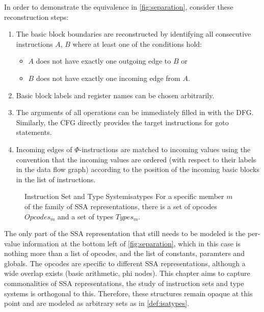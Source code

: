     In order to demonstrate the equivalence in \autoref{fig:separation},
    consider these reconstruction steps:
\begin{enumerate}
    \item The basic block boundaries are reconstructed by identifying all
          consecutive instructions $A$, $B$ where at least one of the
    conditions hold:
    \begin{itemize}
        \item $A$ does not have exactly one outgoing edge to $B$ or
        \item $B$ does not have exactly one incoming edge from $A$.
    \end{itemize}
    \item Basic block labels and register names can be chosen arbitrarily.
    \item The arguments of all operations can be immediately filled in with the 
          DFG. Similarly, the CFG directly provides the target instructions
          for goto statements.
    \item Incoming edges of $\Phi$-instructions are matched to incoming values
          using the convention that the incoming values are ordered
          (with respect to their labels in the data flow graph) according to the
          position of the incoming basic blocks in the list of instructions.
\end{enumerate}

\begin{figure}[b]
\begin{definition}{Instruction Set and Type System}{isatypes}
    For a specific member $m$ of the family of SSA representations, there is
    a set of opcodes $Opcodes_m$ and a set of types $Types_m$.
\end{definition}
\end{figure}

    The only part of the SSA representation that still needs to be modeled is
    the per-value information at the bottom left of \autoref{fig:separation},
    which in this case is nothing more than a list of opcodes, and the list of
    constants, paramters and globals.
    The opcodes are specific to different SSA representations, although a wide
    overlap exists (basic arithmetic, phi nodes).
    This chapter aims to capture commonalities of SSA representations, the study
    of instruction sets and type systems is orthogonal to this.
    Therefore, these structures remain opaque at this point and are modeled as
    arbitrary sets as in \autoref{def:isatypes}.

